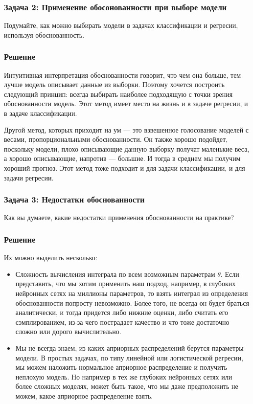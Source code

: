 \subsubsection{Задача 2: Применение обосонованности при выборе модели}
Подумайте, как можно выбирать модели в задачах классификации и регресии, используя обоснованность.
\subsubsection{Решение}

Интуитивная интерпретация обоснованности говорит, что чем она больше, тем лучше модель описывает данные из выборки. Поэтому хочется построить следующий принцип: всегда выбирать наиболее подходящую с точки зрения обоснованности модель. Этот метод имеет место на жизнь и в задаче регресии, и в задаче классификации.

Другой метод, которых приходит на ум --- это взвешенное голосование моделей с весами, пропорциональными обоснованности. Он также хорошо подойдет, поскольку модели, плохо описывающие данную выборку получат маленькие веса, а хорошо описывающие, напротив --- большие. И тогда в среднем мы получим хороший прогноз. Этот метод тоже подходит и для задачи классификации, и для задачи регресии.

\subsubsection{Задача 3: Недостатки обоснованности}
Как вы думаете, какие недостатки применения обоснованности на практике?
\subsubsection{Решение}

Их можно выделить несколько:
\begin{itemize}
 \item Сложность вычисления интеграла по всем возможным параметрам $\theta$. Если представить, что мы хотим применить наш подход, например, в глубоких нейронных сетях на миллионы параметров, то взять интеграл из определения обоснованности попросту невозможно. Более того, не всегда он будет браться аналитически, и тогда придется либо нижние оценки, либо считать его сэмплированием, из-за чего пострадает качество и что тоже достаточно сложно или дорого вычислительно.
 \item Мы не всегда знаем, из каких априорных распределений берутся параметры модели. В простых задачах, по типу линейной или логистической регресии, мы можем наложить нормальное априорное распределение и получить неплохую модель. Но например в тех же глубоких нейронных сетях или более сложных моделях, может быть такое, что мы даже предположить не можем, какое априорное распределение взять.
\end{itemize}



